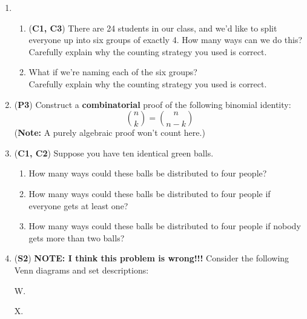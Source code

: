 \documentclass[12pt]{article}
\def\firstcircle{(90:1cm) circle (1.5cm)}
\def\secondcircle{(210:1cm) circle (1.5cm)}
\def\thirdcircle{(330:1cm) circle (1.5cm)}
\def\universer{(-3, -2.5) rectangle (3, 2.75)}
\begin{document}
\begin{enumerate}
\item 
\begin{enumerate} 
\item (\textbf{C1, C3}) There are 24 students in our class, and we'd like to split everyone up into six groups of exactly 4. How many ways can we do this?\\
Carefully explain why the counting strategy you used is correct.


\item What if we're naming each of the six groups?\\
Carefully explain why the counting strategy you used is correct.

\end{enumerate}

\item (\textbf{P3}) Construct a \textbf{combinatorial} proof of the following binomial identity: 
\[\binom{n}{k} = \binom{n}{n-k}\]
(\textbf{Note:} A purely algebraic proof won't count here.)


\item (\textbf{C1, C2}) Suppose you have ten identical green balls.

\begin{enumerate}
    \item How many ways could these balls be distributed to four people? 
    \item How many ways could these balls be distributed to four people if everyone gets at least one? 
    \item How many ways could these balls be distributed to four people if nobody gets more than two balls?
\end{enumerate}


\item (\textbf{S2}) \textbf{NOTE: I think this problem is wrong!!!} Consider the following Venn diagrams and set descriptions:

W. 
\hfill
X. 
\hfill\, %


\end{enumerate}
\end{document}
